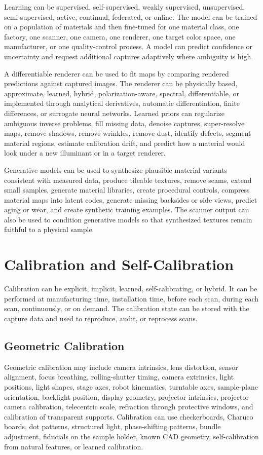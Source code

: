 \documentclass[11pt, twoside, listof=totocnumbered, bibliography=totocnumbered]{scrartcl}
\begin{document}
	Learning can be supervised, self-supervised, weakly supervised, unsupervised, semi-supervised, active, continual, federated, or online. The model can be trained on a population of materials and then fine-tuned for one material class, one factory, one scanner, one camera, one renderer, one target color space, one manufacturer, or one quality-control process. A model can predict confidence or uncertainty and request additional captures adaptively where ambiguity is high.
	
	A differentiable renderer can be used to fit maps by comparing rendered predictions against captured images. The renderer can be physically based, approximate, learned, hybrid, polarization-aware, spectral, differentiable, or implemented through analytical derivatives, automatic differentiation, finite differences, or surrogate neural networks. Learned priors can regularize ambiguous inverse problems, fill missing data, denoise captures, super-resolve maps, remove shadows, remove wrinkles, remove dust, identify defects, segment material regions, estimate calibration drift, and predict how a material would look under a new illuminant or in a target renderer.
	
	Generative models can be used to synthesize plausible material variants consistent with measured data, produce tileable textures, remove seams, extend small samples, generate material libraries, create procedural controls, compress material maps into latent codes, generate missing backsides or side views, predict aging or wear, and create synthetic training examples. The scanner output can also be used to condition generative models so that synthesized textures remain faithful to a physical sample.
	
	\section{Calibration and Self-Calibration}
	Calibration can be explicit, implicit, learned, self-calibrating, or hybrid. It can be performed at manufacturing time, installation time, before each scan, during each scan, continuously, or on demand. The calibration state can be stored with the capture data and used to reproduce, audit, or reprocess scans.
	
	\subsection{Geometric Calibration}
	Geometric calibration may include camera intrinsics, lens distortion, sensor alignment, focus breathing, rolling-shutter timing, camera extrinsics, light positions, light shapes, stage axes, robot kinematics, turntable axes, sample-plane orientation, backlight position, display geometry, projector intrinsics, projector-camera calibration, telecentric scale, refraction through protective windows, and calibration of transparent supports. Calibration can use checkerboards, Charuco boards, dot patterns, structured light, phase-shifting patterns, bundle adjustment, fiducials on the sample holder, known CAD geometry, self-calibration from natural features, or learned calibration.
	
\end{document}
